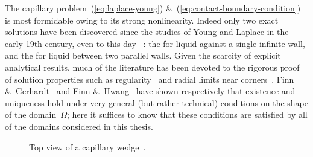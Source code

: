 \begin{figure}
\end{figure}

The capillary problem~(\ref{eq:laplace-young})
\&~(\ref{eq:contact-boundary-condition})
is most formidable owing to its strong nonlinearity.
Indeed only two exact solutions have been discovered
since the studies of Young and Laplace
in the early 19th-century,
even to this day~%
  \cite{anderson-2006-exact-solutions-laplace-young}:
the  for liquid against a single infinite wall,
and the  for liquid between two parallel walls.
Given the scarcity of explicit analytical results,
much of the literature has been devoted
to the rigorous proof of solution properties
such as
regularity~\cite{
  gerhardt-1976-global-regularity-solutions-capillarity,
  gerhardt-1980-free-bvp-capillary-surfaces,
  simon-1980-regularity-capillary-surfaces-corners,
  tam-1986-regularity-capillary-corners-borderline
}
and
radial limits near corners~\cite{
  crenshaw-2018-generalization-radial-limits-bounded,
  entekhabi-2017-radial-limits-capillary-corners,
  lancaster-1996-bounded-h-re-entrant,
  lancaster-1996-radial-limits-bounded-capillary,
  lancaster-1997-correction-radial-limits-bounded,
  lancaster-2012-remarks-nonparametric-capillary-corners
}.
Finn \&~Gerhardt~\cite{finn-1977-internal-sphere-condition-capillary}
and Finn \&~Hwang~\cite{finn-1989-comparison-principle-capillary-surfaces}
have shown respectively that existence and uniqueness hold
under very general (but rather technical) conditions
on the shape of the domain~$\Omega$;
here it suffices to know that these conditions are satisfied
by all of the domains considered in this thesis.

\begin{figure}
  \newcommand*{\subfigurewidth}{0.27\textwidth}
  \begin{subfigure}{\subfigurewidth}
  \end{subfigure}
  \hfill
  \begin{subfigure}{\subfigurewidth}
  \end{subfigure}
  \hfill
  \begin{subfigure}{\subfigurewidth}
  \end{subfigure}
  \caption{
    Top view of a capillary wedge~.
  }
  \label{fig:capillary-wedge-domain}
\end{figure}

